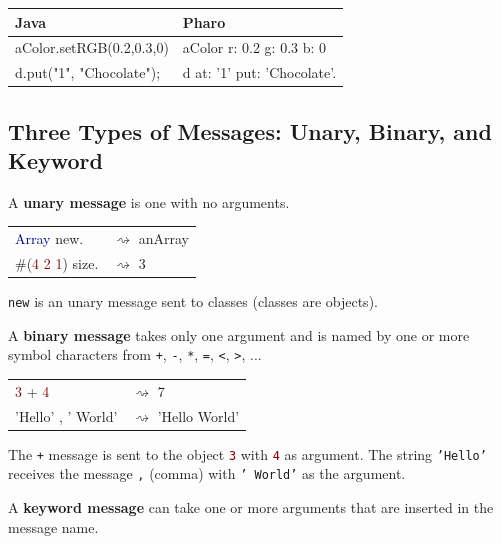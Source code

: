 \documentclass[notumble]{leaflet}
\newcommand{\code}[1]{\foreignlanguage{english}{\texttt{#1}}}
\begin{document}
\noindent
\begin{tabularx}{\linewidth}{@{}lX@{}}
        \toprule
        \textbf{Java} & \textbf{Pharo}\\
        \midrule
      aColor.setRGB(0.2,0.3,0) & aColor r: 0.2 g: 0.3 b: 0 \\
      d.put("1", "Chocolate");& d at: '1' put: 'Chocolate'.\\
       \midrule
\end{tabularx}


\subsection{Three Types of Messages: Unary, Binary, and Keyword}

A \textbf{unary message} is one with no arguments.

\noindent
\begin{tabularx}{\linewidth}{@{}lX@{}}
        \toprule
      \textcolor{darkBlue}{Array} new.& $\rightsquigarrow$ anArray \\
      \#(\textcolor{darkRed}{4 2 1}) size.& $\rightsquigarrow$ 3\\
       \midrule
\end{tabularx}

\code{new} is an unary message sent to classes (classes are objects). 

A \textbf{binary message} takes only one
argument and is named by one or more symbol characters from \code{+}, \code{-}, \code{*}, \code{=}, \code{<}, \code{>}, ...

\noindent
\begin{tabularx}{\linewidth}{@{}lX@{}}
        \toprule
      \textcolor{darkRed}{3} + \textcolor{darkRed}{4}& $\rightsquigarrow$ 7 \\
     \textcolor{string}{'Hello'} , \textcolor{string}{' World'}& $\rightsquigarrow$ 'Hello World'\\
       \midrule
\end{tabularx}


The \code{+} message is sent to the object
\textcolor{darkRed}{\code{3}} with \textcolor{darkRed}{\code{4}} as
 argument. The string \textcolor{string}{\code{'Hello'}} receives the message \code{,}
(comma) with \textcolor{string}{\code{'~World'}} as the argument.

A \textbf{keyword message} can take one or more
arguments that are inserted in the message name.
\end{document}
